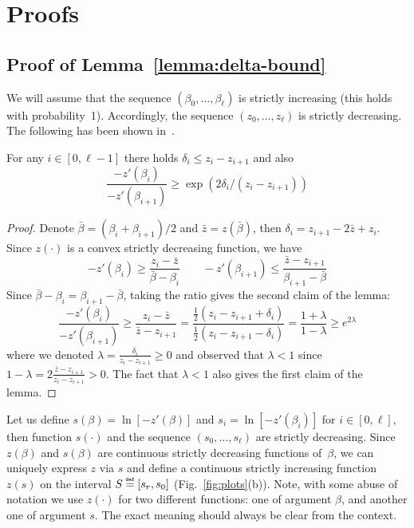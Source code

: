 \documentclass[final,12pt]{colt2018}
\newcommand{\eqdef}{{\stackrel{\mbox{\tiny \tt ~def~}}{=}}}
\begin{document}



\pagebreak
\appendix


\section{Proofs}
\subsection{Proof of Lemma~\ref{lemma:delta-bound}}\label{sec:lemma:delta-bound:proof}

We will assume that the sequence $(\beta_0,\ldots,\beta_\ell)$ is strictly increasing (this holds with probability~1).
Accordingly, the sequence $(z_0,\ldots,z_\ell)$ is strictly decreasing.
The following has been shown in~\citep{Stefankovic:JACM09,Huber:Gibbs}.
\begin{lemma} For any $i\in[0,\ell-1]$ there holds
$\delta_i\le z_i-z_{i+1}$ and also
$$
\frac{-z'(\beta_{i})}{-z'(\beta_{i+1})} \ge \exp(2\delta_i/(z_i-z_{i+1})) 
$$ 
\end{lemma}
\begin{proof}
Denote $\bar \beta=(\beta_i+\beta_{i+1})/2$ and $\bar z=z(\bar \beta)$, then $\delta_i=z_{i+1}-2\bar z+z_i$.
 Since $z(\cdot)$ is a convex strictly decreasing function, 
we have
$$
-z'(\beta_{i})\ge\frac{z_i-\bar z}{\bar\beta-\beta_i}\qquad 
-z'(\beta_{i+1})\le\frac{\bar z-z_{i+1}}{\beta_{i+1}-\bar\beta}
$$
Since $\bar\beta-\beta_i=\beta_{i+1}-\bar\beta$, taking the ratio  gives the second claim of the lemma:
$$
\frac{-z'(\beta_{i})}{-z'(\beta_{i+1})}
\ge\frac{z_i-\bar z}{\bar z-z_{i+1}}
=\frac{\frac{1}{2}(z_i-z_{i+1}+\delta_i)}{\frac{1}{2}(z_i-z_{i+1}-\delta_{i})}=\frac{1+\lambda}{1-\lambda}\ge e^{2\lambda}
$$
where we denoted $\lambda=\frac{\delta_i}{z_i-z_{i+1}}\ge 0$ and observed that $\lambda<1$ since $1-\lambda=2\frac{\bar z-z_{i+1}}{z_i-z_{i+1}}>0$.
The fact that $\lambda<1$ also gives the first claim of the lemma.
\end{proof}

Let us define $s(\beta)=\ln [-z'(\beta)]$ and $s_i=\ln [-z'(\beta_i)]$ for $i\in[0,\ell]$,
then function $s(\cdot)$ and the sequence $(s_0,\ldots,s_\ell)$ are strictly decreasing.
Since $z(\beta)$ and $s(\beta)$ are continuous strictly decreasing functions of~$\beta$,
we can uniquely express $z$ via $s$ and define a continuous strictly increasing function $z(s)$ on the interval $S\eqdef[s_\ell,s_0]$
 (Fig.~\ref{fig:plots}(b)). Note, with some abuse of notation we use $z(\cdot)$
for two different functions: one of argument $\beta$, and another one of argument $s$.
The exact meaning should always be clear from the context.
\end{document}
